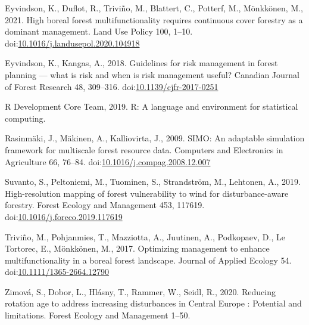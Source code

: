 \documentclass[]{elsarticle} %
\begin{document}
\hypertarget{ref-Eyvindson2020}{}
Eyvindson, K., Duflot, R., Triviño, M., Blattert, C., Potterf, M.,
Mönkkönen, M., 2021. High boreal forest multifunctionality requires
continuous cover forestry as a dominant management. Land Use Policy 100,
1--10.
doi:\href{https://doi.org/10.1016/j.landusepol.2020.104918}{10.1016/j.landusepol.2020.104918}

\hypertarget{ref-Eyvindson2018}{}
Eyvindson, K., Kangas, A., 2018. Guidelines for risk management in
forest planning --- what is risk and when is risk management useful?
Canadian Journal of Forest Research 48, 309--316.
doi:\href{https://doi.org/10.1139/cjfr-2017-0251}{10.1139/cjfr-2017-0251}

\hypertarget{ref-RDevelopmentCoreTeam2019}{}
R Development Core Team, 2019. R: A language and environment for
statistical computing.

\hypertarget{ref-Rasinmaki2009}{}
Rasinmäki, J., Mäkinen, A., Kalliovirta, J., 2009. SIMO: An adaptable
simulation framework for multiscale forest resource data. Computers and
Electronics in Agriculture 66, 76--84.
doi:\href{https://doi.org/10.1016/j.compag.2008.12.007}{10.1016/j.compag.2008.12.007}

\hypertarget{ref-Suvanto2019}{}
Suvanto, S., Peltoniemi, M., Tuominen, S., Strandström, M., Lehtonen,
A., 2019. High-resolution mapping of forest vulnerability to wind for
disturbance-aware forestry. Forest Ecology and Management 453, 117619.
doi:\href{https://doi.org/10.1016/j.foreco.2019.117619}{10.1016/j.foreco.2019.117619}

\hypertarget{ref-Trivino2017}{}
Triviño, M., Pohjanmies, T., Mazziotta, A., Juutinen, A., Podkopaev, D.,
Le Tortorec, E., Mönkkönen, M., 2017. Optimizing management to enhance
multifunctionality in a boreal forest landscape. Journal of Applied
Ecology 54.
doi:\href{https://doi.org/10.1111/1365-2664.12790}{10.1111/1365-2664.12790}

\hypertarget{ref-Zimova2020}{}
Zimová, S., Dobor, L., Hlásny, T., Rammer, W., Seidl, R., 2020. Reducing
rotation age to address increasing disturbances in Central Europe :
Potential and limitations. Forest Ecology and Management 1--50.
\end{document}
